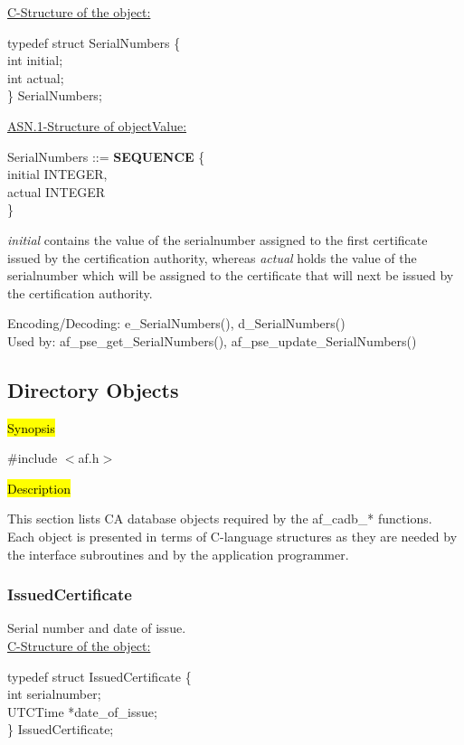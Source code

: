 \underline{C-Structure of the object:}

{\small
\bvtab
\4      typedef struct SerialNumbers \{ \\
\6              int   \3 initial; \\
\6              int   \3 actual; \\
\4      \} SerialNumbers;
\evtab
}

\underline{ASN.1-Structure of objectValue:}

{\small
\bvtab
\3 SerialNumbers ::= \3 {\bf SEQUENCE} \{     \\
\7 initial         \2 INTEGER,    \\
\7 actual          \2 INTEGER     \\
\6 \}
\evtab
}

{\em initial} contains the value of the serialnumber assigned to the first
certificate issued by the certification authority, whereas {\em actual}
holds the value of the serialnumber which will be assigned to the certificate that will next be issued
by the certification authority.


Encoding/Decoding: e\_SerialNumbers(), d\_SerialNumbers() \\
Used by: af\_pse\_get\_SerialNumbers(), af\_pse\_update\_SerialNumbers()


\subsection{Directory Objects}
\label{cadb}

\hl{Synopsis}

\#include $<$af.h$>$

\hl{Description}
     
This section lists CA database objects required by the af\_cadb\_* functions. 
Each object is presented in terms of C-language structures as they are needed by the 
interface subroutines and by the application programmer. 
\subsubsection{IssuedCertificate}
Serial number and date of issue. \\
\underline{C-Structure of the object:}

{\small
\btab
\1      typedef struct IssuedCertificate \{ \\
\2              int  \2          serialnumber; \\
\2              UTCTime \2  *date\_of\_issue; \\
\1       \} IssuedCertificate; \\
\etab
}

